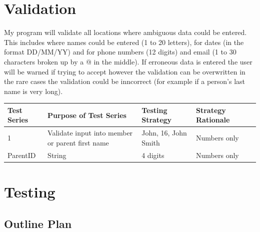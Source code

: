 {\section{Validation}
My program will validate all locations where ambiguous data could be entered. This includes where names could be entered (1 to 20 letters), for dates (in the format DD/MM/YY) and for phone numbers (12 digits) and email (1 to 30 characters broken up by a @ in the middle). If erroneous data is entered the user will be warned if trying to accept however the validation can be overwritten in the rare cases the validation could be inncorrect (for example if a person's last name is very long).

\begin{center}
	\begin{tabular}{|p{2cm}|p{2cm}|p{2cm}|p{2cm}|l}
		\hline
		\textbf{Test Series}   & \textbf{Purpose of Test Series}   & \textbf{Testing Strategy}   & \textbf{Strategy Rationale} \\ \hline
		1                       & Validate input into member or parent first name  & John, 16, John Smith  & Numbers only \\ \hline
		ParentID                             & String            & 4 digits                & Numbers only \\ \hline
\end{tabular}
\end{center}

\section{Testing}

\begin{landscape}
\subsection{Outline Plan}


\end{landscape}}
